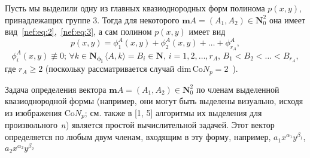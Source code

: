Пусть мы выделили одну из главных квазиоднородных форм полинома $p(x,y)$, принадлежащих группе 3. Тогда для некоторого $\mathbf{m}A=(A_1,A_2)\in\mathbf{N}^2_0$ она имеет вид~\eqref{nef:eq:2},~\eqref{nef:eq:3}, а сам полином $p(x,y)$ имеет вид
\begin{equation} \label{nef:eq:6}
	p(x,y)=\phi^A_1(x,y)+\phi^A_2(x,y)+\ldots+\phi^A_{r_A},
\end{equation}
\begin{equation}
	\phi^A_i(x,y)\not\equiv0;\, \forall k\in\mathbf{N_{\phi_i}}\,\langle A,k\rangle=B_i\in\mathbf{N},\, i=1,2,\ldots,r_A,\, B_1<B_2<\ldots<B_{r_A},
\end{equation}
где $r_A\geq2$ (поскольку рассматривается случай  $\text{dim} \, \text{Co}N_p=2$~\cite{nef:4}).

Задача определения вектора $\mathbf{m}A=(A_1,A_2)\in\mathbf{N}^2_0$ по членам выделенной квазиоднородной формы (например, они могут быть выделены визуально, исходя из изображения $\text{Co}N_p$; см. также в [1, 5] алгоритмы их выделения для произвольного $\emph{n}$) является простой вычислительной задачей. Этот вектор определяется по любым двум членам, входящим в эту форму, например, $a_1x^{\alpha_1}y^{\beta_1}$, $a_2x^{\alpha_2}y^{\beta_2}$